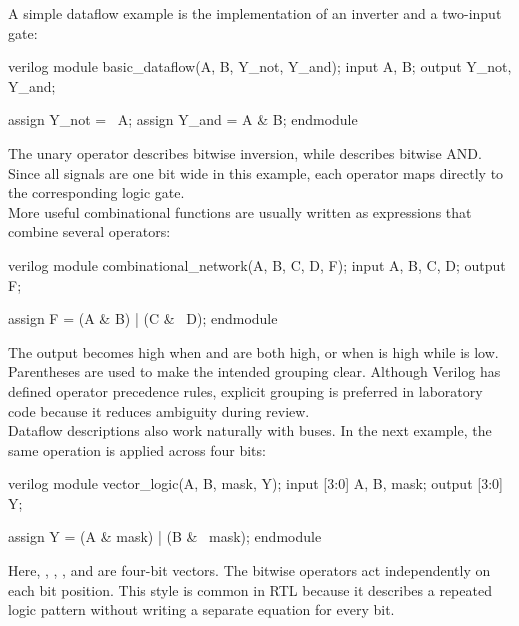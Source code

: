 \noindent A simple dataflow example is the implementation of an inverter and a two-input gate:

\begin{codeblock}{verilog}
module basic_dataflow(A, B, Y_not, Y_and);
    input A, B;
    output Y_not, Y_and;

    assign Y_not = ~A;
    assign Y_and = A & B;
endmodule
\end{codeblock}

\noindent The unary operator \inlinecode{~} describes bitwise inversion, while \inlinecode{&}
describes bitwise AND. Since all signals are one bit wide in this example, each operator maps
directly to the corresponding logic gate.\\

\noindent More useful combinational functions are usually written as expressions that combine
several operators:

\begin{codeblock}{verilog}
module combinational_network(A, B, C, D, F);
    input A, B, C, D;
    output F;

    assign F = (A & B) | (C & ~D);
endmodule
\end{codeblock}

\noindent The output  becomes high when  and  are both
high, or when  is high while  is low. Parentheses are used to make the
intended grouping clear. Although Verilog has defined operator precedence rules, explicit grouping
is preferred in laboratory code because it reduces ambiguity during review.\\

\noindent Dataflow descriptions also work naturally with buses. In the next example, the same
operation is applied across four bits:

\begin{codeblock}{verilog}
module vector_logic(A, B, mask, Y);
    input [3:0] A, B, mask;
    output [3:0] Y;

    assign Y = (A & mask) | (B & ~mask);
endmodule
\end{codeblock}

\noindent Here, , , , and  are four-bit
vectors. The bitwise operators act independently on each bit position. This style is common in RTL
because it describes a repeated logic pattern without writing a separate equation for every bit.\\

